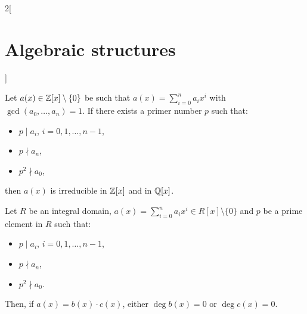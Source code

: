 \documentclass[../../../main.tex]{subfiles}
\begin{document}
\begin{multicols}{2}[\section{Algebraic structures}]
\begin{theorem}
  \end{theorem}
  \begin{theorem}
    Let $a(x)\in\mathbb{Z}[x]\setminus\{0\}$ be such that $a(x)=\sum_{i=0}^na_ix^i$ with $\gcd(a_0,\ldots,a_n)=1$. If there exists a primer number $p$ such that:
    \begin{itemize}
      \item $p\mid a_i$, $i=0,1,\ldots,n-1$,
      \item $p\nmid a_n$,
      \item $p^2\nmid a_0$,
    \end{itemize}
    then $a(x)$ is irreducible in $\mathbb{Z}[x]$ and in $\mathbb{Q}[x]$.
  \end{theorem}
  \begin{theorem}
    Let $R$ be an integral domain, $a(x)=\sum_{i=0}^na_ix^i\in R[x]\setminus\{0\}$ and $p$ be a prime element in $R$ such that:
    \begin{itemize}
      \item $p\mid a_i$, $i=0,1,\ldots,n-1$,
      \item $p\nmid a_n$,
      \item $p^2\nmid a_0$.
    \end{itemize}
    Then, if $a(x)=b(x)\cdot c(x)$, either $\deg b(x)=0$ or $\deg c(x)=0$.
  \end{theorem}

\end{multicols}
\end{document}
